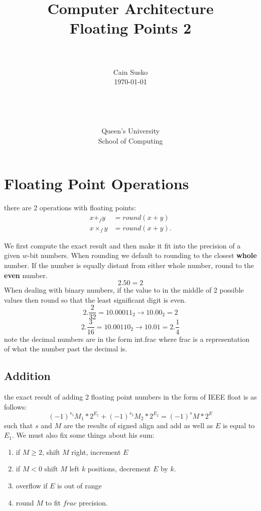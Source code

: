 \documentclass[12pt]{book}
\newcommand{\classID}{Floating Points 2}
\newcommand{\coursename}{Computer Architecture}
\begin{document}
\date{}
\setlength{\parindent}{0em}  %

\title{\coursename\\\classID}

\author{\\ \\ Cain Susko\\\today \\ \\ \\ \\ \\
        Queen's University \\School of Computing} 
 

\maketitle
\pagebreak

\section*{Floating Point Operations}
there are 2 operations with floating points:
\begin{align*}
        x+_f y &= round(x+y)\\
        x \times_f y &= round\left( x+y \right) 
.\end{align*} 

We first compute the exact result and then make it fit into the precision of
        a given $w$-bit numbers.
When rounding we default to rounding to the closest \textbf{whole} number.
If the number is equally distant from either whole number, round to the \textbf{even}
        number.\\
\[2.50 = 2\]
When dealing with binary numbers, if the value to in the middle of 2 possible values
        then round so that the least significant digit is even.
\[2.\frac{2}{32}=10.00011_2 \rightarrow 10.00_2 = 2\]
\[2.\frac{3}{16}=10.00110_2 \rightarrow 10.01 = 2.\frac{1}{4}\]
note the decimal numbers are in the form int.frac where frac is a representation of
        what the number past the decimal is.
\subsection*{Addition}
the exact result of adding 2 floating point numbers in the form of IEEE float is as follows:
\[(-1)^{s_1} M_1 *2^{E_1} + (-1)^{s_2} M_2 *2^{E_2}= (-1)^sM*2^E\]
such that $s$ and  $M$ are the results of signed align and add as well as
        $E$ is equal to $E_1$.
We must also fix some things about his sum:
\begin{enumerate}
        \item if $M \geq 2$, shift $M$ right, increment $E$
        \item if $M<0$ shift  $M$ left  $k$ positions, decrement  $E$ by $k$.
        \item overflow if $E$ is out of range
        \item round  $M$ to fit  $frac$ precision.
\end{enumerate}
\end{document}
